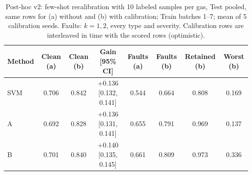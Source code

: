 \begin{table}[t]
\centering
\caption{Post-hoc v2: few-shot recalibration with 10 labeled samples per gas, Test pooled, same rows for (a) without and (b) with calibration; Train batches 1--7; mean of 5 calibration seeds. Faults: $k=1,2$, every type and severity. Calibration rows are interleaved in time with the scored rows (optimistic).}
\label{tab:v2recal}
\setlength{\tabcolsep}{4pt}
\begin{tabular}{lccccccc}
\toprule
Method & Clean (a) & Clean (b) & Gain [95\% CI] & Faults (a) & Faults (b) & Retained (b) & Worst (b) \\
\midrule
SVM & 0.706 & 0.842 & +0.136 [0.132, 0.141] & 0.544 & 0.664 & 0.808 & 0.169 \\
A & 0.692 & 0.828 & +0.136 [0.131, 0.141] & 0.655 & 0.791 & 0.969 & 0.137 \\
B & 0.701 & 0.840 & +0.140 [0.135, 0.145] & 0.661 & 0.809 & 0.973 & 0.336 \\
\bottomrule
\end{tabular}
\end{table}
